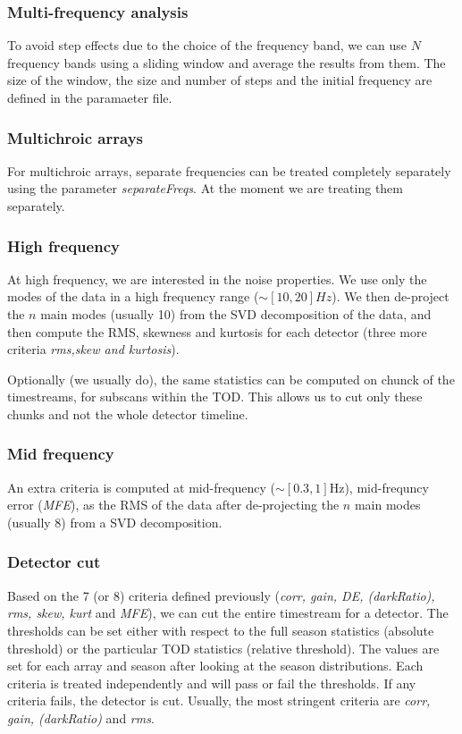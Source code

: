 \documentclass[a4paper, 11pt]{article}
\begin{document}
\subsubsection*{Multi-frequency analysis}
To avoid step effects due to the choice of the frequency band, we can use $N$ frequency bands using a sliding window and average the results from them. The size of the window, the size and number of steps and the initial frequency are defined in the paramaeter file.

\subsubsection*{Multichroic arrays}
For multichroic arrays, separate frequencies can be treated completely separately using the parameter \emph{separateFreqs}. At the moment we are treating them separately.



\subsubsection{High frequency}
At high frequency, we are interested in the noise properties. We use only the modes of the data in a high frequency range ($\sim [10,20]Hz$). We then de-project the $n$ main modes (usually 10) from the SVD decomposition of the data, and then compute the RMS, skewness and kurtosis for each detector (three more criteria \emph{rms,skew and kurtosis}).

Optionally (we usually do), the same statistics can be computed on chunck of the timestreams, for subscans within the TOD. This allows us to cut only these chunks and not the whole detector timeline.


\subsubsection{Mid frequency}
An extra criteria is computed at mid-frequency ($\sim[0.3,1]$Hz), mid-frequncy error (\emph{MFE}), as the RMS of the data after de-projecting the $n$ main modes (usually 8) from a SVD decomposition.

\subsubsection{Detector cut}
Based on the 7 (or 8) criteria defined previously (\emph{corr, gain, DE, (darkRatio), rms, skew, kurt} and \emph{MFE}), we can cut the entire timestream for a detector. The thresholds can be set either with respect to the full season statistics (absolute threshold) or the particular TOD statistics (relative threshold). The values are set for each array and season after looking at the season distributions. Each criteria is treated independently and will pass or fail the thresholds. If any criteria fails, the detector is cut. Usually, the most stringent criteria are \emph{corr, gain, (darkRatio)} and \emph{rms}.
\end{document}

